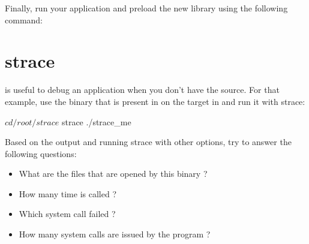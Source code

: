 Finally, run your application and preload the new library using the following
command:

\section{strace}

 is useful to debug an application when you don't have the source.
For that example, use the  binary that is present in on the
target in  and run it with strace:

\begin{bashinput}
$ cd /root/strace
$ strace ./strace_me
\end{bashinput}

Based on the output and running strace with other options, try to answer the
following questions:
\begin{itemize}
  \item What are the files that are opened by this binary ?
  \item How many time is  called ?
  \item Which  system call failed ?
  \item How many system calls are issued by the program ?
\end{itemize}